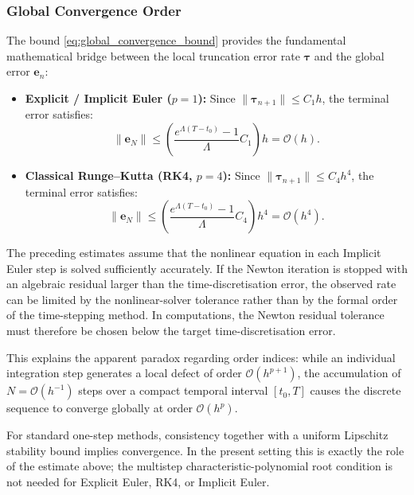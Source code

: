 \subsubsection{Global Convergence Order}
The bound \eqref{eq:global_convergence_bound} provides the fundamental mathematical bridge between the local truncation error rate $\boldsymbol{\tau}$ and the global error $\mathbf{e}_n$:
\begin{itemize}
    \item \textbf{Explicit / Implicit Euler ($p=1$):} Since $\|\boldsymbol{\tau}_{n+1}\| \le C_1 h$, the terminal error satisfies:
    \begin{equation}
    \label{eq:euler_global_order}
    \|\mathbf{e}_N\| \le \left( \frac{e^{\Lambda(T - t_0)} - 1}{\Lambda} C_1 \right) h = \mathcal{O}(h).
    \end{equation}
    \item \textbf{Classical Runge--Kutta (RK4, $p=4$):} Since $\|\boldsymbol{\tau}_{n+1}\| \le C_4 h^4$, the terminal error satisfies:
    \begin{equation}
    \label{eq:rk4_global_order}
    \|\mathbf{e}_N\| \le \left( \frac{e^{\Lambda(T - t_0)} - 1}{\Lambda} C_4 \right) h^4 = \mathcal{O}(h^4).
    \end{equation}
\end{itemize}
The preceding estimates assume that the nonlinear equation in each
Implicit Euler step is solved sufficiently accurately. If the Newton
iteration is stopped with an algebraic residual larger than the
time-discretisation error, the observed rate can be limited by the
nonlinear-solver tolerance rather than by the formal order of the
time-stepping method. In computations, the Newton residual tolerance
must therefore be chosen below the target time-discretisation error.

This explains the apparent paradox regarding order indices: while an individual integration step generates a local defect of order $\mathcal{O}(h^{p+1})$, the accumulation of $N = \mathcal{O}(h^{-1})$ steps over a compact temporal interval $[t_0, T]$ causes the discrete sequence to converge globally at order $\mathcal{O}(h^p)$.

For standard one-step methods, consistency together with a uniform Lipschitz stability bound implies convergence. In the present setting this is exactly the role of the estimate above; the multistep characteristic-polynomial root condition is not needed for Explicit Euler, RK4, or Implicit Euler.

